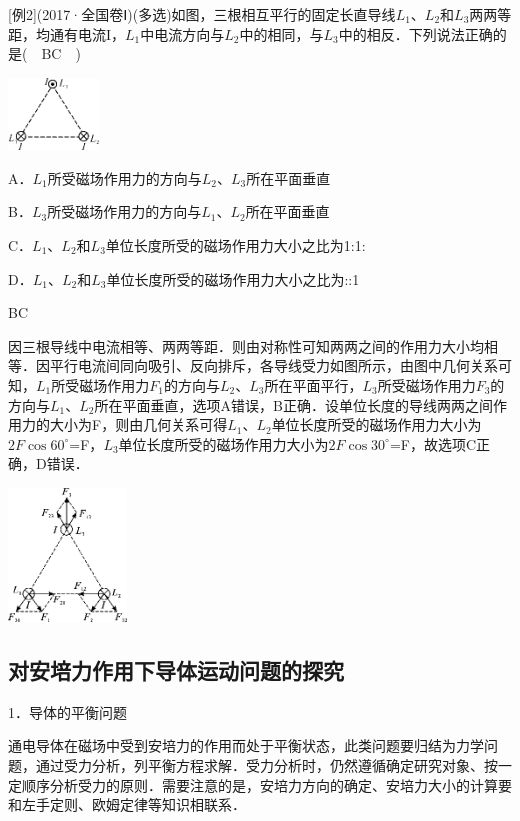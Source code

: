 {[}例2{]}(2017·全国卷Ⅰ)(多选)如图，三根相互平行的固定长直导线$L_1$、$L_2$和$L_3$两两等距，均通有电流I，$L_1$中电流方向与$L_2$中的相同，与$L_3$中的相反．下列说法正确的是(　BC　)

\begin{center}\includegraphics[width=0.94306in,height=0.75486in]{media/image342.png}\end{center}

A．$L_1$所受磁场作用力的方向与$L_2$、$L_3$所在平面垂直

B．$L_3$所受磁场作用力的方向与$L_1$、$L_2$所在平面垂直

C．$L_1$、$L_2$和$L_3$单位长度所受的磁场作用力大小之比为1:1:

D．$L_1$、$L_2$和$L_3$单位长度所受的磁场作用力大小之比为::1
\begin{solution}
	BC
	
	因三根导线中电流相等、两两等距．则由对称性可知两两之间的作用力大小均相等．因平行电流间同向吸引、反向排斥，各导线受力如图所示，由图中几何关系可知，$L_1$所受磁场作用力$F_1$的方向与$L_2$、$L_3$所在平面平行，$L_3$所受磁场作用力$F_3$的方向与$L_1$、$L_2$所在平面垂直，选项A错误，B正确．设单位长度的导线两两之间作用力的大小为F，则由几何关系可得$L_1$、$L_2$单位长度所受的磁场作用力大小为$2F\cos 60^\circ$=F，$L_3$单位长度所受的磁场作用力大小为$2F\cos 30^\circ$=F，故选项C正确，D错误．
\end{solution}

\begin{center}\includegraphics[width=1.23611in,height=1.39653in]{media/image343.png}\end{center}
\subsection{对安培力作用下导体运动问题的探究}

1．导体的平衡问题

通电导体在磁场中受到安培力的作用而处于平衡状态，此类问题要归结为力学问题，通过受力分析，列平衡方程求解．受力分析时，仍然遵循确定研究对象、按一定顺序分析受力的原则．需要注意的是，安培力方向的确定、安培力大小的计算要和左手定则、欧姆定律等知识相联系．

